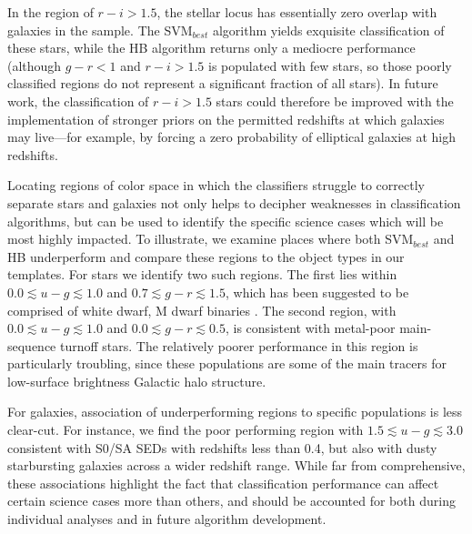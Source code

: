 \documentclass[12pt,preprint]{aastex}
\begin{document}
In the region of $r-i>1.5$, the stellar locus has essentially zero
overlap with galaxies in the sample.  The SVM$_{best}$ algorithm
yields exquisite classification of these stars, while the HB algorithm
returns only a mediocre performance (although $g-r < 1$ and $r-i >
1.5$ is populated with few stars, so those poorly classified regions
do not represent a significant fraction of all stars).  In future
work, the classification of $r-i > 1.5$ stars could therefore be
improved with the implementation of stronger priors on the permitted
redshifts at which galaxies may live---for example, by forcing a zero
probability of elliptical galaxies at high redshifts.

Locating regions of color space in which the classifiers struggle to
correctly separate stars and galaxies not only helps to decipher
weaknesses in classification algorithms, but can be used to identify
the specific science cases which will be most highly impacted.  To
illustrate, we examine places where both SVM$_{best}$ and HB
underperform and compare these regions to the object types in our
templates.  For stars we identify two such regions.  The first lies 
 within $0.0\lesssim u-g \lesssim 1.0$ and $0.7\lesssim g-r \lesssim
1.5$, which has been suggested to be comprised of white dwarf, M dwarf 
binaries \citep{silvestri06, covey07}.  The second region, with 
$0.0\lesssim u-g \lesssim 1.0$ and $0.0\lesssim g-r \lesssim 0.5$, is 
consistent with metal-poor main-sequence turnoff stars.  The relatively 
poorer performance in this region is particularly troubling, since these 
populations are some of the main tracers for low-surface brightness 
Galactic halo structure.  

For galaxies, association of underperforming regions to specific
populations is less clear-cut.  For instance, we find the poor
performing region with $1.5\lesssim u-g \lesssim 3.0$ consistent with
S0/SA SEDs with redshifts less than 0.4, but also with dusty
starbursting galaxies across a wider redshift range.  While far from
comprehensive, these associations highlight the fact that
classification performance can affect certain science cases more than
others, and should be accounted for both during individual analyses
and in future algorithm development.
\end{document}
